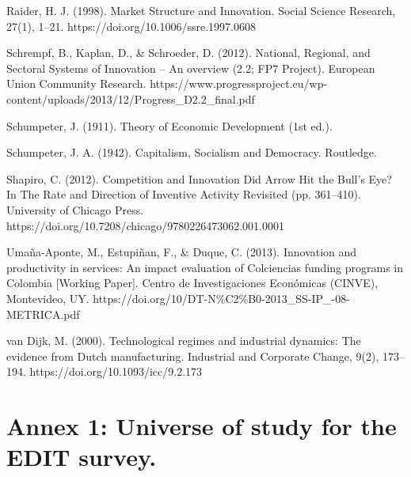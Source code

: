 \documentclass[12pt,a4paper]{article}
\begin{document}
{Raider, H. J. (1998). Market Structure and Innovation. Social Science Research, 27(1), 1–21. https://doi.org/10.1006/ssre.1997.0608

Schrempf, B., Kaplan, D., \& Schroeder, D. (2012). National, Regional, and Sectoral Systems of Innovation –   An overview (2.2; FP7 Project). European Union Community Research. https://www.progressproject.eu/wp-content/uploads/2013/12/Progress\_D2.2\_final.pdf

Schumpeter, J. (1911). Theory of Economic Development (1st ed.).

Schumpeter, J. A. (1942). Capitalism, Socialism and Democracy. Routledge.

Shapiro, C. (2012). Competition and Innovation Did Arrow Hit the Bull’s Eye? In The Rate and Direction of Inventive Activity Revisited (pp. 361–410). University of Chicago Press. https://doi.org/10.7208/chicago/9780226473062.001.0001

Umaña-Aponte, M., Estupiñan, F., \& Duque, C. (2013). Innovation and productivity in services: An impact evaluation of Colciencias funding programs in Colombia [Working Paper]. Centro de Investigaciones Económicas (CINVE), Montevideo, UY. https://doi.org/10/DT-N\%C2\%B0-2013\_SS-IP\_-08-METRICA.pdf

van Dijk, M. (2000). Technological regimes and industrial dynamics: The evidence from Dutch manufacturing. Industrial and Corporate Change, 9(2), 173–194. https://doi.org/10.1093/icc/9.2.173


\pagebreak
\appendix
\section{Annex 1: Universe of study for the EDIT survey.}

}
\end{document}
